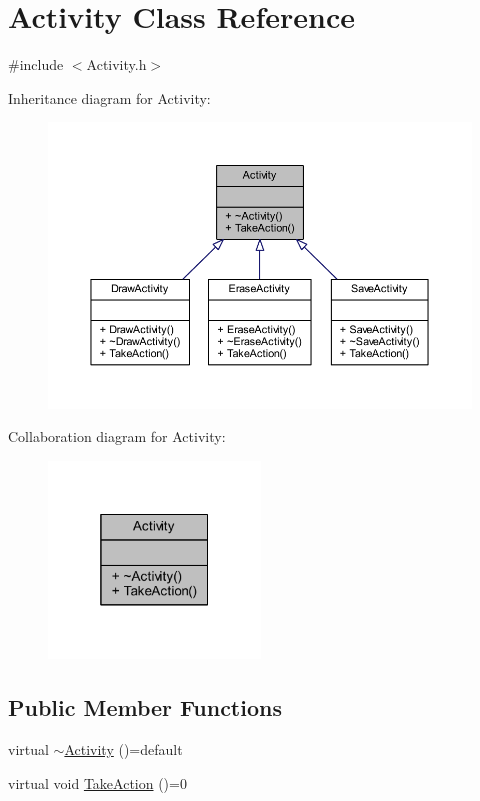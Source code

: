 \hypertarget{class_activity}{}\section{Activity Class Reference}
\label{class_activity}


{\ttfamily \#include $<$Activity.\+h$>$}



Inheritance diagram for Activity\+:\nopagebreak
\begin{figure}[H]
\begin{center}
\leavevmode
\includegraphics[width=350pt]{class_activity__inherit__graph}
\end{center}
\end{figure}


Collaboration diagram for Activity\+:\nopagebreak
\begin{figure}[H]
\begin{center}
\leavevmode
\includegraphics[width=160pt]{class_activity__coll__graph}
\end{center}
\end{figure}
\subsection*{Public Member Functions}
\begin{DoxyCompactItemize}
\item 
virtual \mbox{\hyperlink{class_activity_aef5c28e82c93f6da8a924d088bc9b58b}{$\sim$\+Activity}} ()=default
\item 
virtual void \mbox{\hyperlink{class_activity_af1bed13c5ae595ee7940dee2d34f7989}{Take\+Action}} ()=0
\end{DoxyCompactItemize}


